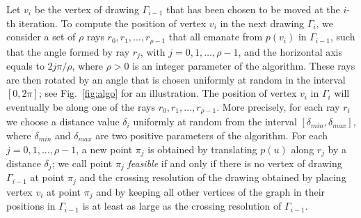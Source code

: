 \documentclass{comjnl}
\begin{document}
Let $v_i$ be the vertex of drawing $\Gamma_{i-1}$ that has been chosen to be moved at the $i$-th iteration. To compute the position of vertex $v_i$ in the next drawing $\Gamma_i$, we consider a set of $\rho$ rays $r_0,r_1,\ldots,r_{\rho-1}$ that all emanate from $p(v_i)$ in $\Gamma_{i-1}$, such that the angle formed by ray $r_j$, with $j=0,1,\ldots,\rho-1$, and the horizontal axis equals to $2j\pi/\rho$, where $\rho>0$ is an integer parameter of the algorithm. These rays are then rotated by an angle that is chosen uniformly at random in the interval $[0,2\pi]$; see Fig.~\ref{fig:algo} for an illustration. The position of vertex $v_i$ in $\Gamma_i$ will eventually be along one of the rays $r_0,r_1,\ldots,r_{\rho-1}$. More precisely, for each ray $r_i$ we choose a distance value $\delta_i$ uniformly at random from the interval $[\delta_{min},\delta_{max}]$, where $\delta_{min}$ and $\delta_{max}$ are two positive parameters of the algorithm. For each $j=0,1,\ldots,\rho-1$, a new point $\pi_j$ is obtained by translating $p(u)$ along $r_j$ by a distance $\delta_j$; we call point $\pi_j$ \emph{feasible} if and only if there is no vertex of drawing $\Gamma_{i-1}$ at point $\pi_j$ and the crossing resolution of the drawing obtained by placing vertex $v_i$ at point $\pi_j$ and by keeping all other vertices of the graph in their positions in $\Gamma_{i-1}$ is at least as large as the crossing resolution of $\Gamma_{i-1}$.
\end{document}
